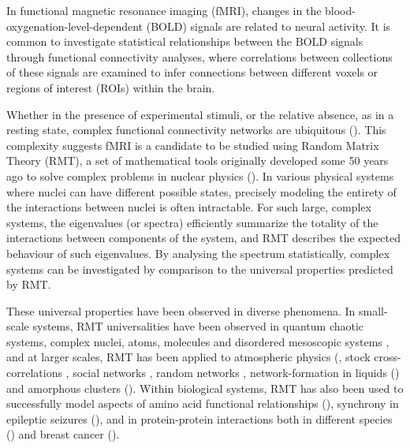 In functional magnetic resonance imaging (fMRI), changes in the blood-oxygenation-level-dependent
(BOLD) signals are related to neural activity. It is common to investigate statistical relationships
between the BOLD signals through functional connectivity analyses, where correlations between
collections of these signals are examined to infer connections between different voxels or regions
of interest (ROIs) within the brain.

Whether in the presence of experimental stimuli, or the relative absence, as in a resting state,
complex functional connectivity networks are ubiquitous
(\cite{bucknerBrainDefaultNetwork2008,foxCoverHumanBrain2005,gonzalez-castilloTaskbasedDynamicFunctional2018,hermundstadStructuralFoundationsRestingstate2013}).
This complexity suggests fMRI is a candidate to be studied using Random Matrix Theory (RMT), a set
of mathematical tools originally developed some 50 years ago to solve complex problems in nuclear
physics (\cite{guhrRandommatrixTheoriesQuantum1998a,mehtaRandomMatrices2004}). In various
physical systems where nuclei can have different possible states, precisely modeling the entirety of
the interactions between nuclei is often intractable. For such large, complex systems, the
eigenvalues (or spectra) efficiently summarize the totality of the interactions between components
of the system, and RMT describes the expected behaviour of such eigenvalues. By analysing the
spectrum statistically, complex systems can be investigated by comparison to the universal
properties predicted by RMT.

\begin{sloppypar}
These universal properties have been observed in diverse phenomena. In small-scale systems, RMT
universalities have been observed in quantum chaotic systems, complex nuclei, atoms, molecules and
disordered mesoscopic systems \cite{guhrRandommatrixTheoriesQuantum1998a,mehtaRandomMatrices2004,brodyRandommatrixPhysicsSpectrum1981,beenakkerRandommatrixTheoryQuantum1997,bohigasHigherOrderCorrelationsSpectra1985,wintgenLevelStatisticsQuantized1988,pandeySkewOrthogonalPolynomialsUniversality2001}, and at larger scales, RMT has been applied to atmospheric
physics (\cite{santhanamStatisticsAtmosphericCorrelations2001}, stock cross-correlations \cite{plerouRandomMatrixApproach2002} , social networks \cite{jalanUncoveringRandomnessSuccess2014}, random networks \cite{bandyopadhyayUniversalityComplexNetworks2007},
network-formation in liquids (\cite{sastrySpectralStatisticsInstantaneous2001,matharooSpectralStatisticsQuenched2009})  and amorphous clusters (\cite{sarkarUniversalityVibrationalSpectra2004,matharooVibrationalSpectraAmorphous2005,matharooUniversalityVibrationalSpectra2008}). Within biological systems,
RMT has also been used to successfully model aspects of  amino acid functional relationships (\cite{bhadolaTargetingFunctionalMotifs2016}),
synchrony in epileptic seizures (\cite{osorioPhasesynchronizationRandommatrixBased2011}), and in protein-protein interactions both in different species (\cite{agrawalQuantifyingRandomnessProtein2014}) and breast cancer (\cite{raiRandomnessPreservedPatterns2015}).
\end{sloppypar}

